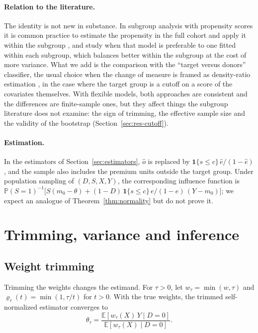 \documentclass[twoside,11pt]{article}
\newcommand{\E}{\mathbb{E}}
\newcommand{\PP}{\mathbb{P}}
\newcommand{\ind}{\mathbf{1}}
\theoremstyle{plain}
\theoremstyle{definition}
\begin{document}
\paragraph{Relation to the literature.} The identity is not new in substance. In subgroup analysis with propensity scores it is common practice to estimate the propensity in the full cohort and apply it within the subgroup \citep{rassen2012}, and \citet{dong2020} study when that model is preferable to one fitted within each subgroup, which balances better within the subgroup at the cost of more variance. What we add is the comparison with the ``target versus donors'' classifier, the usual choice when the change of measure is framed as density-ratio estimation \citep{bickel2009,sugiyama2012}, in the case where the target group is a cutoff on a score of the covariates themselves. With flexible models, both approaches are consistent and the differences are finite-sample ones, but they affect things the subgroup literature does not examine: the sign of trimming, the effective sample size and the validity of the bootstrap (Section~\ref{sec:res-cutoff}).

\paragraph{Estimation.} In the estimators of Section~\ref{sec:estimators}, $\hat o$ is replaced by $\ind\{s\le c\}\,\hat e/(1-\hat e)$, and the sample also includes the premium units outside the target group. Under population sampling of $(D,S,X,Y)$, the corresponding influence function is $\PP(S=1)^{-1}\bigl[S(m_0-\theta)+(1-D)\,\ind\{s\le c\}\,e/(1-e)\,(Y-m_0)\bigr]$; we expect an analogue of Theorem~\ref{thm:normality} but do not prove it.
\section{Trimming, variance and inference}\label{sec:inference}

\subsection{Weight trimming}\label{sec:trimming}

Trimming the weights changes the estimand. For $\tau>0$, let $w_\tau=\min(w,\tau)$ and $\varrho_\tau(t)=\min(1,\tau/t)$ for $t>0$. With the true weights, the trimmed self-normalized estimator converges to
\[
\theta_\tau=\frac{\E[w_\tau(X)\,Y\mid D=0]}{\E[w_\tau(X)\mid D=0]}.
\]
\end{document}
